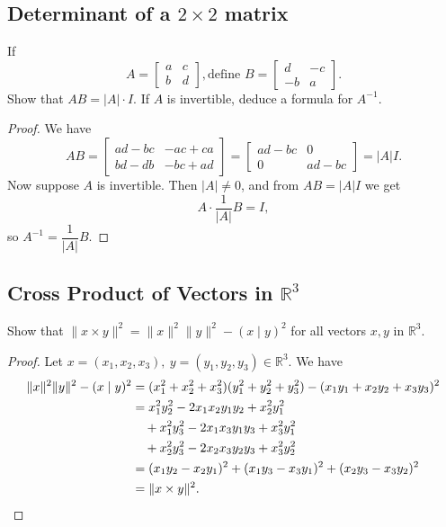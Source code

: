 \subsection{Determinant of a $2 \times 2$ matrix}


\begin{tcolorbox}[title=Problem 3, breakable]
    If 
    \[A = 
    \begin{bmatrix}
        a & c \\ b & d
    \end{bmatrix}, \text{define } B = 
    \begin{bmatrix}
        d & -c \\
        -b & a
    \end{bmatrix}.\]
    Show that $AB = |A| \cdot I$. If $A$ is invertible,
        deduce a formula for $A^{-1}$.
\end{tcolorbox}

\begin{proof}
    We have
    \[AB =
    \begin{bmatrix}
        ad - bc & -ac + ca \\
        bd - db & -bc + ad
    \end{bmatrix} =
    \begin{bmatrix}
        ad - bc & 0 \\
        0 & ad - bc
    \end{bmatrix} = |A|I.\]
    Now suppose $A$ is invertible. Then $|A| \ne 0$, and from $AB = |A|I$ we get
    \[A \cdot \frac{1}{|A|}B = I,\]
    so $A^{-1} = \dfrac{1}{|A|}B$.
\end{proof}

\subsection{Cross Product of Vectors in $\mathbb{R}^3$}

\begin{tcolorbox}[title=Problem 1, breakable]
    Show that $\|x \times y\|^2 = \|x\|^2 \|y\|^2 - (x \mid y)^2$
    for all vectors $x, y$ in $\mathbb{R}^3$.
\end{tcolorbox}

\begin{proof}
Let $x = (x_1, x_2, x_3),\ y = (y_1, y_2, y_3) \in \mathbb{R}^3$. We have
\begin{align*}
\|x\|^2\|y\|^2 - (x\mid y)^2
    &= (x_1^2+x_2^2+x_3^2)(y_1^2+y_2^2+y_3^2) - (x_1 y_1 + x_2 y_2 + x_3 y_3)^2 \\
    &= x_1^2 y_2^2 - 2x_1 x_2 y_1 y_2 + x_2^2 y_1^2 \\
    &\quad + x_1^2 y_3^2 - 2x_1 x_3 y_1 y_3 + x_3^2 y_1^2 \\
    &\quad + x_2^2 y_3^2 - 2x_2 x_3 y_2 y_3 + x_3^2 y_2^2 \\
    &= (x_1 y_2 - x_2 y_1)^2 + (x_1 y_3 - x_3 y_1)^2 + (x_2 y_3 - x_3 y_2)^2 \\
    &= \|x \times y\|^2. \qedhere
\end{align*}
\end{proof}

